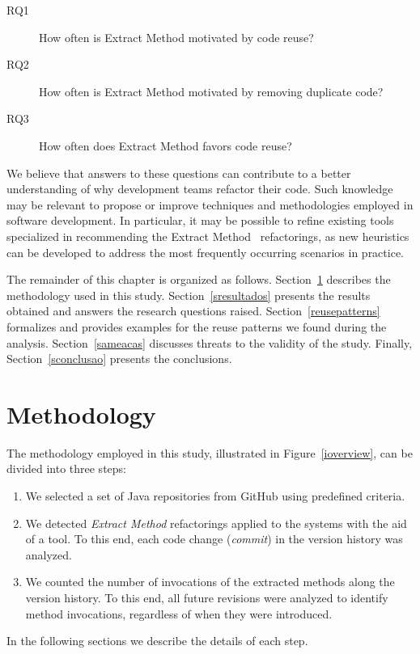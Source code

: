 \begin{description}
\item[RQ1] How often is Extract Method motivated by code reuse?
\item[RQ2] How often is Extract Method motivated by removing duplicate code?
\item[RQ3] How often does Extract Method favors code reuse?%
\end{description}

We believe that answers to these questions can contribute to a better understanding of why development teams refactor their code. Such knowledge may be relevant to propose or improve techniques and methodologies employed in software development. In particular, it may be possible to refine existing tools specialized in recommending the Extract Method~\citep{Silva:2014, Tsantalis:2011} refactorings, as new heuristics can be developed to address the most frequently occurring scenarios in practice.

The remainder of this chapter is organized as follows. Section~\ref{smetodologia} describes the methodology used in this study.
Section~\ref{sresultados} presents the results obtained and answers the research questions raised.
Section~\ref{reusepatterns} formalizes and provides examples for the reuse patterns we found during the analysis.
Section~\ref{sameacas} discusses threats to the validity of the study.
Finally, Section~\ref{sconclusao} presents the conclusions.


\section{Methodology}
\label{smetodologia}

The methodology employed in this study, illustrated in Figure~\ref{ioverview}, can be divided into three steps:
\begin{enumerate}
\item We selected a set of Java repositories from GitHub using predefined criteria.
\item We detected \emph{Extract Method} refactorings applied to the systems with the aid of a tool. To this end, each code change (\emph{commit}) in the version history was analyzed.
\item We counted the number of invocations of the extracted methods along the version history. 
To this end, all future revisions were analyzed to identify method invocations, regardless of when they were introduced.
\end{enumerate}
In the following sections we describe the details of each step.

